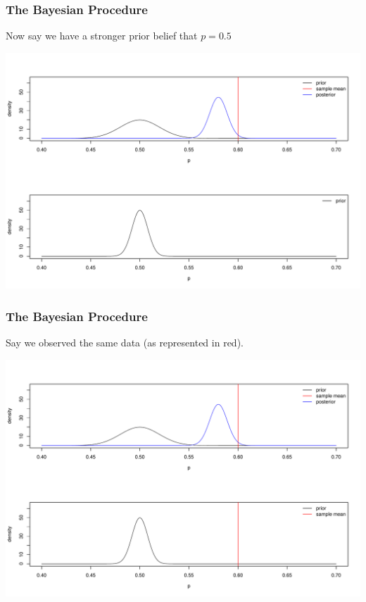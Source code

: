 \documentclass[handout]{beamer}
\begin{document}
\begin{frame}
\frametitle{The Bayesian Procedure}
Now say we have a stronger prior belief that $p=0.5$
\begin{center}
\includegraphics[width=\textwidth]{figure/bayes4.pdf} 
\end{center}

\end{frame}


\begin{frame}
\frametitle{The Bayesian Procedure}
Say we observed the same data (as represented in red).
\begin{center}
\includegraphics[width=\textwidth]{figure/bayes5.pdf} 
\end{center}

\end{frame}
\end{document}
